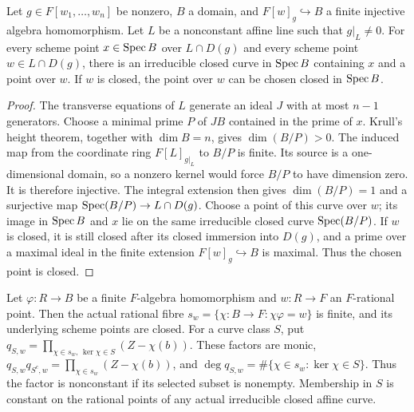 \begin{lemma}\label{lem:fc-line-components}
\leanok
{}
Let $g\in F[w_1,\ldots,w_n]$ be nonzero, $B$ a domain, and
$F[w]_g\hookrightarrow B$ a finite injective algebra homomorphism. Let $L$ be a nonconstant affine line
such that $g|_L\ne0$. For every scheme point $x\in\operatorname{Spec} B$ over $L\cap D(g)$ and every scheme point
$w\in L\cap D(g)$, there is an irreducible closed curve in $\operatorname{Spec} B$ containing $x$ and a point over $w$.
If $w$ is closed, the point over $w$ can be chosen closed in $\operatorname{Spec} B$.
\end{lemma}

\begin{proof}
The transverse equations of $L$ generate an ideal $J$ with at most $n-1$ generators. Choose a minimal
prime $P$ of $JB$ contained in the prime of $x$. Krull's height theorem, together with $\dim B=n$,
gives $\dim(B/P)>0$. The induced map from the coordinate ring $F[L]_{g|_L}$ to $B/P$ is finite.
Its source is a one-dimensional domain, so a nonzero kernel would force $B/P$ to have dimension zero.
It is therefore injective. The integral extension then gives $\dim(B/P)=1$ and a surjective map
$\operatorname{Spec}(B/P)\to L\cap D(g)$. Choose a point of this curve over $w$; its image in $\operatorname{Spec} B$ and $x$
lie on the same irreducible closed curve $\operatorname{Spec}(B/P)$.
If $w$ is closed, it is still closed after its closed immersion into $D(g)$, and a prime over a maximal
ideal in the finite extension $F[w]_g\hookrightarrow B$ is maximal. Thus the chosen point is closed.
\end{proof}

\begin{lemma}\label{lem:fc-rational-fibre-factors}
\leanok
{}
Let $\varphi\colon R\to B$ be a finite $F$-algebra homomorphism and $w\colon R\to F$ an $F$-rational point.
Then the actual rational fibre $s_w=\{\chi\colon B\to F:\chi\varphi=w\}$ is finite, and its underlying scheme
points are closed. For a curve class $S$, put
$q_{S,w}=\prod_{\chi\in s_w,\,\ker\chi\in S}(Z-\chi(b))$.
These factors are monic, $q_{S,w}q_{S^c,w}=\prod_{\chi\in s_w}(Z-\chi(b))$, and
$\deg q_{S,w}=\#\{\chi\in s_w:\ker\chi\in S\}$. Thus the factor is nonconstant if its selected subset is nonempty.
Membership in $S$ is constant on the rational points of any actual irreducible closed affine curve.
\end{lemma}

